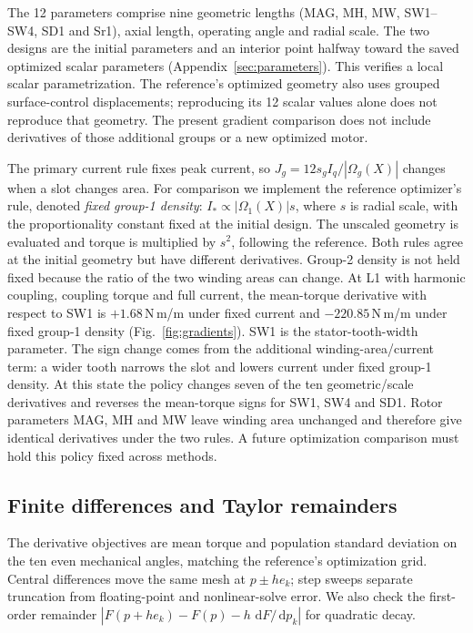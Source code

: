 \documentclass{anvil-paper}
\newcommand{\dd}{\,\mathrm{d}}
\begin{document}
The 12 parameters comprise nine geometric lengths (MAG, MH, MW,
SW1--SW4, SD1 and Sr1), axial length, operating angle and radial scale.
The two designs are the initial parameters and an interior point halfway
toward the saved optimized scalar parameters
(Appendix~\ref{sec:parameters}). This verifies a local scalar
parametrization. The reference's optimized geometry also uses grouped
surface-control displacements; reproducing its 12 scalar values alone
does not reproduce that geometry. The present gradient comparison does
not include derivatives of those additional groups or a new optimized
motor.

The primary current rule fixes peak current, so
$J_g=12s_g I_q/|\Omega_g(X)|$ changes when a slot changes area.
For comparison we implement the reference optimizer's rule, denoted
\emph{fixed group-1 density}: $I_*\propto |\Omega_1(X)|s$, where $s$ is
radial scale, with the proportionality constant fixed at the initial
design. The unscaled geometry is evaluated and torque is multiplied by
$s^2$, following the reference. Both rules agree at the initial geometry
but have different derivatives. Group-2 density is not held fixed because
the ratio of the two winding areas can change. At L1 with harmonic coupling,
coupling torque and full
current, the mean-torque derivative with respect to SW1 is
$+1.68$\,N\,m/m under fixed current and $-220.85$\,N\,m/m under fixed
group-1 density (Fig.~\ref{fig:gradients}). SW1 is the stator-tooth-width
parameter. The sign change comes from the additional winding-area/current
term: a wider tooth narrows the slot and lowers current under fixed
group-1 density. At this state the policy changes seven of the ten
geometric/scale derivatives and reverses the mean-torque signs for SW1,
SW4 and SD1. Rotor parameters MAG, MH and MW leave winding area unchanged
and therefore give identical derivatives under the two rules. A future
optimization comparison must hold this policy fixed across methods.

\subsection{Finite differences and Taylor remainders}
The derivative objectives are mean torque and population standard
deviation on the ten even mechanical angles, matching the reference's
optimization grid. Central differences move the same mesh at $p\pm h e_k$;
step sweeps separate truncation from floating-point and nonlinear-solve
error. We also check the first-order remainder
$|F(p+h e_k)-F(p)-h\,\dd F/\dd p_k|$ for quadratic decay.
\end{document}
